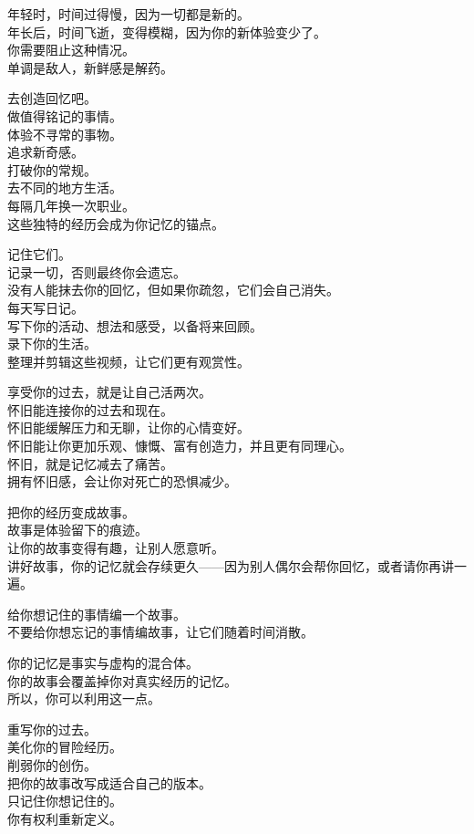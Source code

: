 \documentclass[
]{article}
\begin{document}
年轻时，时间过得慢，因为一切都是新的。\\
年长后，时间飞逝，变得模糊，因为你的新体验变少了。\\
你需要阻止这种情况。\\
单调是敌人，新鲜感是解药。

去创造回忆吧。\\
做值得铭记的事情。\\
体验不寻常的事物。\\
追求新奇感。\\
打破你的常规。\\
去不同的地方生活。\\
每隔几年换一次职业。\\
这些独特的经历会成为你记忆的锚点。

记住它们。\\
记录一切，否则最终你会遗忘。\\
没有人能抹去你的回忆，但如果你疏忽，它们会自己消失。\\
每天写日记。\\
写下你的活动、想法和感受，以备将来回顾。\\
录下你的生活。\\
整理并剪辑这些视频，让它们更有观赏性。

享受你的过去，就是让自己活两次。\\
怀旧能连接你的过去和现在。\\
怀旧能缓解压力和无聊，让你的心情变好。\\
怀旧能让你更加乐观、慷慨、富有创造力，并且更有同理心。\\
怀旧，就是记忆减去了痛苦。\\
拥有怀旧感，会让你对死亡的恐惧减少。

把你的经历变成故事。\\
故事是体验留下的痕迹。\\
让你的故事变得有趣，让别人愿意听。\\
讲好故事，你的记忆就会存续更久------因为别人偶尔会帮你回忆，或者请你再讲一遍。

给你想记住的事情编一个故事。\\
不要给你想忘记的事情编故事，让它们随着时间消散。

你的记忆是事实与虚构的混合体。\\
你的故事会覆盖掉你对真实经历的记忆。\\
所以，你可以利用这一点。

重写你的过去。\\
美化你的冒险经历。\\
削弱你的创伤。\\
把你的故事改写成适合自己的版本。\\
只记住你想记住的。\\
你有权利重新定义。
\end{document}
